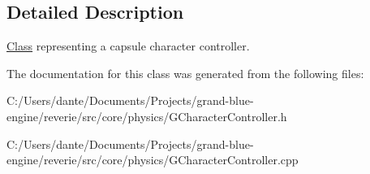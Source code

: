 \subsection{Detailed Description}
\mbox{\hyperlink{struct_class}{Class}} representing a capsule character controller. 

The documentation for this class was generated from the following files\+:\begin{DoxyCompactItemize}
\item 
C\+:/\+Users/dante/\+Documents/\+Projects/grand-\/blue-\/engine/reverie/src/core/physics/G\+Character\+Controller.\+h\item 
C\+:/\+Users/dante/\+Documents/\+Projects/grand-\/blue-\/engine/reverie/src/core/physics/G\+Character\+Controller.\+cpp\end{DoxyCompactItemize}
